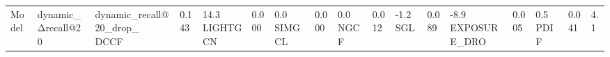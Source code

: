 \begin{tabular}{lllll}
\toprule
Model & dynamic_Δrecall@20 & dynamic_recall@20_drop_%
\midrule
DCCF & 0.143 & 14.3%
LIGHTGCN & 0.000 & 0.0%
SIMGCL & 0.000 & 0.0%
NGCF & 0.012 & -1.2%
SGL & 0.089 & -8.9%
EXPOSURE_DRO & 0.005 & 0.5%
PDIF & 0.041 & 4.1%
\bottomrule
\end{tabular}
